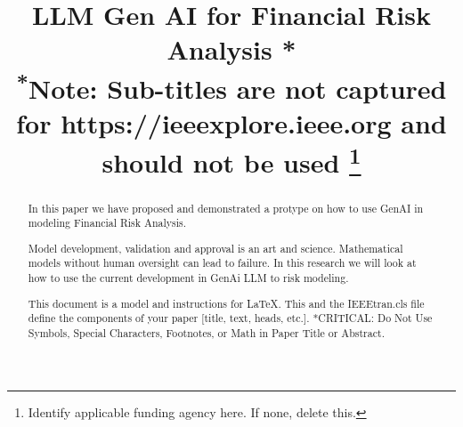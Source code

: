 \documentclass[conference]{IEEEtran}
\begin{document}
\title{LLM Gen AI for Financial Risk Analysis *\\
{\footnotesize \textsuperscript{*}Note: Sub-titles are not captured for https://ieeexplore.ieee.org  and
should not be used}
\thanks{Identify applicable funding agency here. If none, delete this.}
}

\author{
\and
{}
\and
{}
\and
{}
\and
{}
\and
{}
}

\maketitle

\begin{abstract}
In this paper we have proposed and demonstrated a protype on how to use GenAI in modeling Financial Risk Analysis.

Model development, validation and approval is an art and science. Mathematical models without human oversight can lead to failure. In this research we will look at how to use the current development in GenAi LLM to risk modeling.

This document is a model and instructions for \LaTeX.
This and the IEEEtran.cls file define the components of your paper [title, text, heads, etc.]. *CRITICAL: Do Not Use Symbols, Special Characters, Footnotes, 
or Math in Paper Title or Abstract.
\end{abstract}
\end{document}
